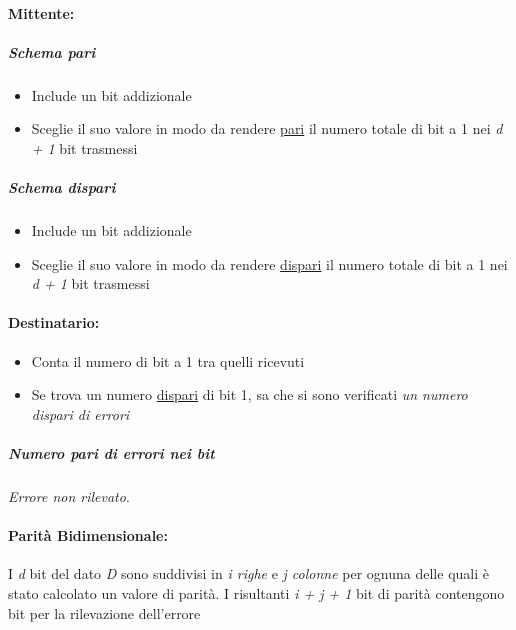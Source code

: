 \documentclass[12pt]{article}
\begin{document}
    \paragraph{Mittente:}
    \subparagraph{\textit{Schema pari}}
    \begin{itemize}
        \item Include un bit addizionale
        \item Sceglie il suo valore in modo da rendere \underline{pari} il numero totale di bit a 1 nei \textit{d + 1} bit trasmessi
    \end{itemize}
    \subparagraph{\textit{Schema dispari}}
    \begin{itemize}
        \item Include un bit addizionale
        \item Sceglie il suo valore in modo da rendere \underline{dispari} il numero totale di bit a 1 nei \textit{d + 1} bit trasmessi
    \end{itemize}

    \paragraph{Destinatario:}
    \begin{itemize}
        \item Conta il numero di bit a 1 tra quelli ricevuti
        \item Se trova un numero \underline{dispari} di bit 1, sa che si sono verificati \textit{un numero dispari di errori}
    \end{itemize}

    \subparagraph{Numero pari di errori nei bit} \textit{Errore non rilevato}.

    \paragraph{Parità Bidimensionale:} I \textit{d} bit del dato \textit{D} sono suddivisi in \textit{i righe} e \textit{j colonne} per ognuna delle quali è stato calcolato un valore di parità.
    I risultanti \textit{i + j + 1} bit di parità contengono bit per la rilevazione dell'errore
\end{document}
